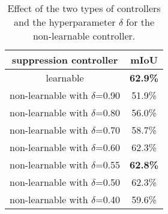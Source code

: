 \documentclass[letterpaper]{article} \usepackage{aaai21}  \usepackage{times}  \usepackage{helvet} \usepackage{courier}  \usepackage[hyphens]{url}  \usepackage{graphicx} \urlstyle{rm} \def\UrlFont{\rm}  \usepackage{natbib}  \usepackage{caption} \frenchspacing  \setlength{\pdfpagewidth}{8.5in}  \setlength{\pdfpageheight}{11in}
\begin{document}
\begin{comment}
\begin{table}[t]
  \centering
  \caption{
    Effect of the two types of controllers and the hyperparameter $\delta$ for the non-learnable controller.
  }
  \label{tab:controller}
  \begin{adjustbox}{max width=\linewidth}
            \begin{tabular}{c|ccccccc}
            \hline
            \multicolumn{8}{c}{suppression controller} \\
            \hline
            learnable & \multicolumn{7}{c}{non-learnable} \\
                      & $\delta$=0.90 & $\delta$=0.80 & $\delta$=0.70 & $\delta$=0.60 & $\delta$=0.55 & $\delta$=0.50 & $\delta$=0.40 \\
            \hline
            \textbf{62.9\%} & 51.9\% & 56.0\% & 58.7\% & 62.3\% & \textbf{62.8\%} & 62.3\% & 59.6\% \\
            
            \hline
          \end{tabular}
        \end{adjustbox}
\end{table}
\end{comment}

\begin{table}[t]
  \centering
  \begin{adjustbox}{max width=\linewidth}
            \begin{tabular}{c|c}
            \hline
            suppression controller & mIoU \\
            \hline
            learnable & \textbf{62.9\%} \\
            non-learnable with $\delta$=0.90 & 51.9\% \\
            non-learnable with $\delta$=0.80 & 56.0\% \\
            non-learnable with $\delta$=0.70 & 58.7\% \\
            non-learnable with $\delta$=0.60 & 62.3\% \\
            non-learnable with $\delta$=0.55 & \textbf{62.8\%} \\
            non-learnable with $\delta$=0.50 & 62.3\% \\
            non-learnable with $\delta$=0.40 & 59.6\% \\
            \hline
          \end{tabular}
  \end{adjustbox}
  \caption{
    Effect of the two types of controllers and the hyperparameter $\delta$ for the non-learnable controller.
  }
  \label{tab:controller}
\end{table}
\end{document}
